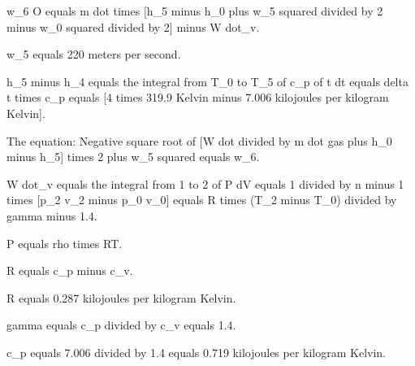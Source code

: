 w_6  
O equals m dot times [h_5 minus h_0 plus w_5 squared divided by 2 minus w_0 squared divided by 2] minus W dot_v.  

w_5 equals 220 meters per second.  

h_5 minus h_4 equals the integral from T_0 to T_5 of c_p of t dt equals delta t times c_p equals [4 times 319.9 Kelvin minus 7.006 kilojoules per kilogram Kelvin].  

The equation:  
Negative square root of [W dot divided by m dot gas plus h_0 minus h_5] times 2 plus w_5 squared equals w_6.  

W dot_v equals the integral from 1 to 2 of P dV equals 1 divided by n minus 1 times [p_2 v_2 minus p_0 v_0] equals R times (T_2 minus T_0) divided by gamma minus 1.4.  

P equals rho times RT.  

R equals c_p minus c_v.  

R equals 0.287 kilojoules per kilogram Kelvin.  

gamma equals c_p divided by c_v equals 1.4.  

c_p equals 7.006 divided by 1.4 equals 0.719 kilojoules per kilogram Kelvin.
